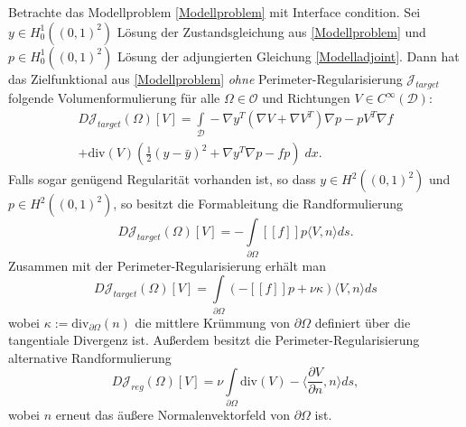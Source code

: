 \begin{theorem}
	Betrachte das Modellproblem \ref{Modellproblem} mit Interface condition. Sei $y\in H^1_0((0,1)^2)$ Lösung der Zustandsgleichung aus \ref{Modellproblem} und $p\in H^1_0((0,1)^2)$ Lösung der adjungierten Gleichung \ref{Modelladjoint}. Dann hat das Zielfunktional aus \ref{Modellproblem} \textit{ohne} Perimeter-Regularisierung $\mathcal{J}_{target}$ folgende Volumenformulierung für alle $\Omega \in \mathcal{O}$ und Richtungen $V \in C^\infty(\mathcal{D})$:
	\begin{equation}\label{shapederivvolume}
	\begin{aligned}
		D\mathcal{J}_{target}(\Omega)[V] = \underset{\mathcal{D}}{\int} -\nabla y^T (\nabla V + \nabla V^T) \nabla p - p V^T \nabla f \\ + \text{div} (V) \left(\frac{1}{2}(y-\bar{y})^2 + \nabla y^T \nabla p - fp\right)\; dx.
	\end{aligned}
	\end{equation}
	Falls sogar genügend Regularität vorhanden ist, so dass $y \in H^2((0,1)^2)$ und $p \in H^2((0,1)^2)$, so besitzt die Formableitung die Randformulierung
	\begin{equation}\label{shapederivsurfacetarget}
	D\mathcal{J}_{target}(\Omega)[V] = -\underset{\partial\Omega}{\int} [[f]]p \langle V,n \rangle ds.
	\end{equation}
	Zusammen mit der Perimeter-Regularisierung erhält man
	\begin{equation}
	D\mathcal{J}_{target}(\Omega)[V] = \underset{\partial\Omega}{\int} (-[[f]]p  + \nu\kappa )\langle V,n \rangle ds 
	\end{equation}
	wobei $\kappa := \text{div}_{\partial\Omega}(n)$ die mittlere Krümmung von $\partial\Omega$ definiert über die tangentiale Divergenz ist. Außerdem besitzt die Perimeter-Regularisierung alternative  Randformulierung
	\begin{equation}\label{shapederivsurfaceperimeter}
	D\mathcal{J}_{reg}(\Omega)[V] = \nu\underset{\partial\Omega}{\int} \text{div}(V) - \langle\frac{\partial V}{\partial n}, n\rangle ds,
	\end{equation}
	wobei $n$ erneut das äußere Normalenvektorfeld von $\partial\Omega$ ist.
\end{theorem}


